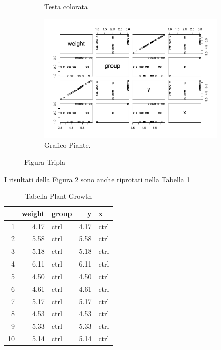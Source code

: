 \documentclass[
]{article}
\begin{document}
\begin{figure}
\begin{subfigure}{0.3\textwidth}
\caption{Testa colorata}
\label{sub:testa}
\end{subfigure}
\begin{subfigure}{0.3\textwidth}

\begin{center}\includegraphics[width=0.8\linewidth]{Latex_knits_09-03-23_files/figure-latex/unnamed-chunk-4-1} \end{center}

\caption{Grafico Piante.}
\label{sub:grafico}
\end{subfigure}
\caption{Figura Tripla}
\label{fig:figTripla}
\end{figure}

I risultati della Figura \ref{sub:grafico} sono anche riprotati nella
Tabella \ref{tab:tabPiante}

\begin{table}[ht]
\centering
\caption{Tabella Plant Growth} 
\label{tab:tabPiante}
\begin{tabular}{rrlrl}
  \hline
 & weight & group & y & x \\ 
  \hline
1 & 4.17 & ctrl & 4.17 & ctrl \\ 
  2 & 5.58 & ctrl & 5.58 & ctrl \\ 
  3 & 5.18 & ctrl & 5.18 & ctrl \\ 
  4 & 6.11 & ctrl & 6.11 & ctrl \\ 
  5 & 4.50 & ctrl & 4.50 & ctrl \\ 
  6 & 4.61 & ctrl & 4.61 & ctrl \\ 
  7 & 5.17 & ctrl & 5.17 & ctrl \\ 
  8 & 4.53 & ctrl & 4.53 & ctrl \\ 
  9 & 5.33 & ctrl & 5.33 & ctrl \\ 
  10 & 5.14 & ctrl & 5.14 & ctrl \\ 
   \hline
\end{tabular}
\end{table}
\end{document}
